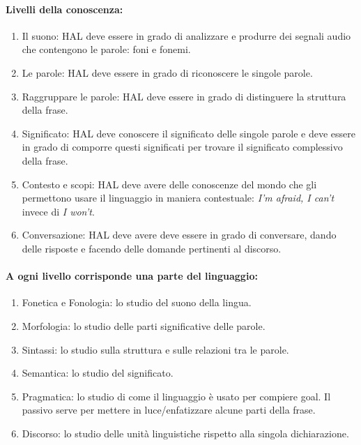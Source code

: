 \paragraph{Livelli della conoscenza:}

\begin{enumerate}
  \item Il suono: HAL deve essere in grado di analizzare e produrre
dei segnali audio che contengono le parole: foni e
fonemi. 
\item Le parole: HAL deve essere in grado di riconoscere le singole
parole. 
\item Raggruppare le parole: HAL deve essere in grado di distinguere la struttura
della frase. 
\item Significato: HAL deve conoscere il significato delle singole
parole e deve essere in grado di comporre questi
significati per trovare il significato complessivo
della frase. 
\item Contesto e scopi: HAL deve avere delle conoscenze del mondo che
gli permettono usare il linguaggio in maniera
contestuale: \textit{I’m afraid, I can’t} invece di \textit{I won't}.
\item Conversazione: HAL deve avere deve essere in grado di
conversare, dando delle risposte e facendo delle
domande pertinenti al discorso. 
\end{enumerate}

\paragraph{A ogni livello corrisponde una parte del linguaggio:}

\begin{enumerate}
  \item Fonetica e Fonologia: lo studio del suono della lingua. 
  \item Morfologia: lo studio delle parti significative delle parole. 
  \item Sintassi: lo studio sulla struttura e sulle relazioni tra le parole. 
  \item Semantica: lo studio del significato. 
  \item Pragmatica: lo studio di come il linguaggio è usato per compiere goal. Il passivo serve per mettere in luce/enfatizzare alcune parti della frase. 
  \item Discorso: lo studio delle unità linguistiche rispetto alla singola dichiarazione.
\end{enumerate}

